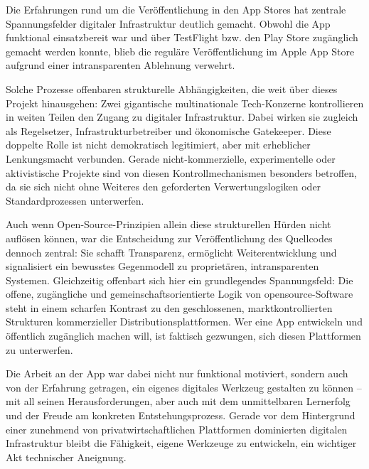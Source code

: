 \vspace{1em}

Die Erfahrungen rund um die Veröffentlichung in den App Stores hat zentrale Spannungsfelder digitaler Infrastruktur deutlich gemacht. Obwohl die App funktional einsatzbereit war und über TestFlight bzw. den Play Store zugänglich gemacht werden konnte, blieb die reguläre Veröffentlichung im Apple App Store aufgrund einer intransparenten Ablehnung verwehrt.

Solche Prozesse offenbaren strukturelle Abhängigkeiten, die weit über dieses Projekt hinausgehen: Zwei gigantische multinationale Tech-Konzerne kontrollieren in weiten Teilen den Zugang zu digitaler Infrastruktur. Dabei wirken sie zugleich als Regelsetzer, Infrastrukturbetreiber und ökonomische Gatekeeper. Diese doppelte Rolle ist nicht demokratisch legitimiert, aber mit erheblicher Lenkungsmacht verbunden. Gerade nicht-kommerzielle, experimentelle oder aktivistische Projekte sind von diesen Kontrollmechanismen besonders betroffen, da sie sich nicht ohne Weiteres den geforderten Verwertungslogiken oder Standardprozessen unterwerfen.

Auch wenn Open-Source-Prinzipien allein diese strukturellen Hürden nicht auflösen können, war die Entscheidung zur Veröffentlichung des Quellcodes dennoch zentral: Sie schafft Transparenz, ermöglicht Weiterentwicklung und signalisiert ein bewusstes Gegenmodell zu proprietären, intransparenten Systemen. Gleichzeitig offenbart sich hier ein grundlegendes Spannungsfeld: Die offene, zugängliche und gemeinschaftsorientierte Logik von \gls{opensource}-Software steht in einem scharfen Kontrast zu den geschlossenen, marktkontrollierten Strukturen kommerzieller Distributionsplattformen. Wer eine App entwickeln und öffentlich zugänglich machen will, ist faktisch gezwungen, sich diesen Plattformen zu unterwerfen.

Die Arbeit an der App war dabei nicht nur funktional motiviert, sondern auch von der Erfahrung getragen, ein eigenes digitales Werkzeug gestalten zu können -- mit all seinen Herausforderungen, aber auch mit dem unmittelbaren Lernerfolg und der Freude am konkreten Entstehungsprozess. Gerade vor dem Hintergrund einer zunehmend von privatwirtschaftlichen Plattformen dominierten digitalen Infrastruktur bleibt die Fähigkeit, eigene Werkzeuge zu entwickeln, ein wichtiger Akt technischer Aneignung.